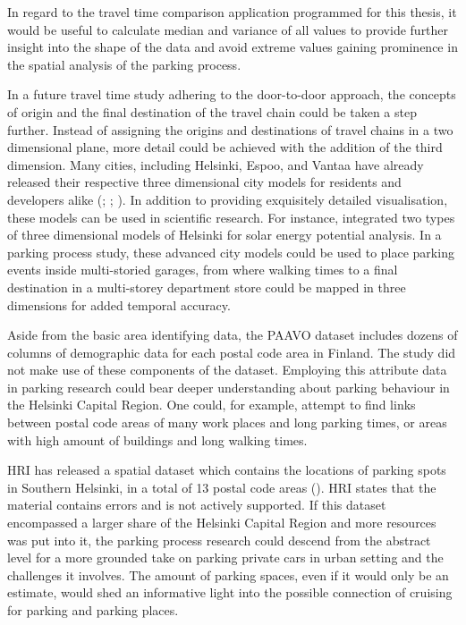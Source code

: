 In regard to the travel time comparison application programmed for this thesis, it would be useful to calculate median and variance of all values to provide further insight into the shape of the data and avoid extreme values gaining prominence in the spatial analysis of the parking process.

In a future travel time study adhering to the door-to-door approach, the concepts of origin and the final destination of the travel chain could be taken a step further. Instead of assigning the origins and destinations of travel chains in a two dimensional plane, more detail could be achieved with the addition of the third dimension. Many cities, including Helsinki, Espoo, and Vantaa have already released their respective three dimensional city models for residents and developers alike (\cite{Helsinginkaupunginkaupunginkanslia2020}; \cite{Espoonkaupungintekninen2018}; \cite{Vantaankaupunki2018}). In addition to providing exquisitely detailed visualisation, these models can be used in scientific research. For instance,  integrated two types of three dimensional models of Helsinki for solar energy potential analysis. In a parking process study, these advanced city models could be used to place parking events inside multi-storied garages, from where walking times to a final destination in a multi-storey department store could be mapped in three dimensions for added temporal accuracy.

Aside from the basic area identifying data, the PAAVO dataset includes dozens of columns of demographic data for each postal code area in Finland. The study did not make use of these components of the dataset. Employing this attribute data in parking research could bear deeper understanding about parking behaviour in the Helsinki Capital Region. One could, for example, attempt to find links between postal code areas of many work places and long parking times, or areas with high amount of buildings and long walking times.

HRI has released a spatial dataset which contains the locations of parking spots in Southern Helsinki, in a total of 13 postal code areas (\cite{Helsinginkaupunkiymparistontoimiala2017}). HRI states that the material contains errors and is not actively supported. If this dataset encompassed a larger share of the Helsinki Capital Region and more resources was put into it, the parking process research could descend from the abstract level for a more grounded take on parking private cars in urban setting and the challenges it involves. The amount of parking spaces, even if it would only be an estimate, would shed an informative light into the possible connection of cruising for parking and parking places.

